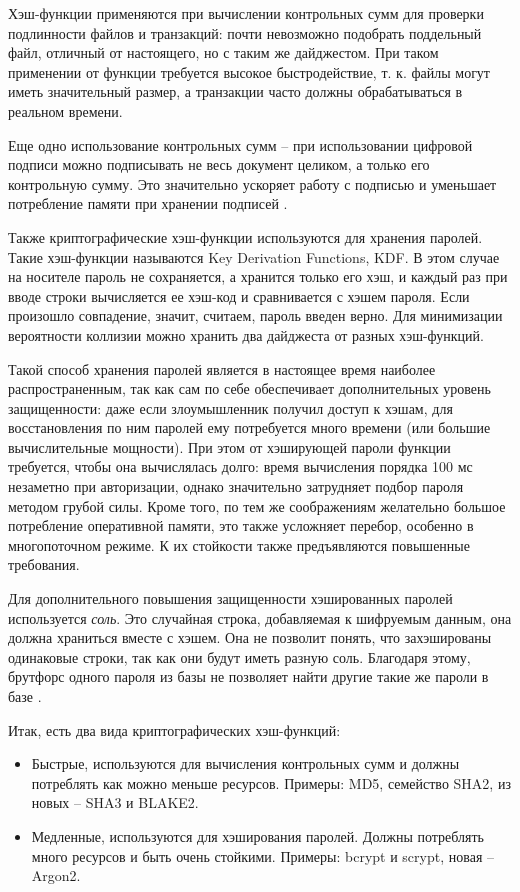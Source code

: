 Хэш-функции применяются при вычислении контрольных сумм для проверки подлинности файлов и транзакций: почти невозможно подобрать поддельный файл, отличный от настоящего, но с таким же дайджестом. При таком применении от функции требуется высокое быстродействие, т. к. файлы могут иметь значительный размер, а транзакции часто должны обрабатываться в реальном времени.

Еще одно использование контрольных сумм – при использовании цифровой подписи можно подписывать не весь документ целиком, а только его контрольную сумму. Это значительно ускоряет работу с подписью и уменьшает потребление памяти при хранении подписей \cite{src15}.

Также криптографические хэш-функции используются для хранения паролей. Такие хэш-функции называются Key Derivation Functions, KDF. В этом случае на носителе пароль не сохраняется, а хранится только его хэш, и каждый раз при вводе строки вычисляется ее хэш-код и сравнивается с хэшем пароля. Если произошло совпадение, значит, считаем, пароль введен верно. Для минимизации вероятности коллизии можно хранить два дайджеста от разных хэш-функций.

Такой способ хранения паролей является в настоящее время наиболее распространенным, так как сам по себе обеспечивает дополнительных уровень защищенности: даже если злоумышленник получил доступ к хэшам, для восстановления по ним паролей ему потребуется много времени (или большие вычислительные мощности). При этом от хэширующей пароли функции требуется, чтобы она вычислялась долго: время вычисления порядка 100 мс незаметно при авторизации, однако значительно затрудняет подбор пароля методом грубой силы. Кроме того, по тем же соображениям желательно большое потребление оперативной памяти, это также усложняет перебор, особенно в многопоточном режиме. К их стойкости также предъявляются повышенные требования.

Для дополнительного повышения защищенности хэшированных паролей используется \textit{соль}. Это случайная строка, добавляемая к шифруемым данным, она должна храниться вместе с хэшем. Она не позволит понять, что захэшированы одинаковые строки, так как они будут иметь разную соль. Благодаря этому, брутфорс одного пароля из базы не позволяет найти другие такие же пароли в базе \cite{src15}.

Итак, есть два вида криптографических хэш-функций:
\begin{itemize}
	\item Быстрые, используются для вычисления контрольных сумм и должны потреблять как можно меньше ресурсов. Примеры: MD5, семейство SHA2, из новых – SHA3 и BLAKE2.
	\item Медленные, используются для хэширования паролей. Должны потреблять много ресурсов и быть очень стойкими. Примеры: bcrypt и scrypt, новая – Argon2.
\end{itemize}

